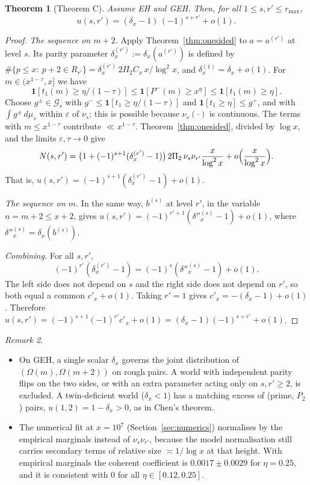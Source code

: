 \documentclass[11pt]{amsart}
\newtheorem{theorem}{Theorem}[section]
\theoremstyle{definition}
\theoremstyle{remark}
\newtheorem{remark}[theorem]{Remark}
\begin{document}
\begin{theorem}[Theorem C]\label{thm:B}
Assume EH and GEH. Then, for all $1\le s,r'\le r_{\max}$,
\[
u(s,r')=(\delta_x-1)\,(-1)^{s+r'}+o(1).
\]
\end{theorem}
\begin{proof}
\emph{The sequence on $m+2$.} Apply Theorem~\ref{thm:onesided} to $a=a^{(r')}$ at level $s$. Its parity parameter $\delta^{(r')}_x:=\delta_x(a^{(r')})$ is defined by $\#\{p\le x:\ p+2\in R_{r'}\}=\delta^{(r')}_x\,2\Pi_2C_x\,x/\log^2x$, and $\delta^{(1)}_x=\delta_x+o(1)$. For $m\in(x^{1-\tau},x]$ we have
\[
\mathbf 1[t_1(m)\ge\eta/(1-\tau)]\le\mathbf 1[P^-(m)\ge x^\eta]\le\mathbf 1[t_1(m)\ge\eta].
\]
Choose $g^\pm\in\mathcal G_s$ with $g^-\le\mathbf 1[t_1\ge\eta/(1-\tau)]$ and $\mathbf 1[t_1\ge\eta]\le g^+$, and with $\int g^\pm\,d\mu_s$ within $\varepsilon$ of $\nu_s$; this is possible because $\nu_s(\cdot)$ is continuous. The terms with $m\le x^{1-\tau}$ contribute $\ll x^{1-\tau}$. Theorem~\ref{thm:onesided}, divided by $\log x$, and the limits $\varepsilon,\tau\to0$ give
\[
N(s,r')=\bigl(1+(-1)^{s+1}(\delta^{(r')}_x-1)\bigr)\,2\Pi_2\,\nu_s\nu_{r'}\frac{x}{\log^2x}+o\Bigl(\frac{x}{\log^2x}\Bigr).
\]
That is, $u(s,r')=(-1)^{s+1}(\delta^{(r')}_x-1)+o(1)$.

\emph{The sequence on $m$.} In the same way, $b^{(s)}$ at level $r'$, in the variable $n=m+2\le x+2$, gives $u(s,r')=(-1)^{r'+1}(\delta''^{(s)}_x-1)+o(1)$, where $\delta''^{(s)}_x=\delta_x(b^{(s)})$.

\emph{Combining.} For all $s,r'$,
\[
(-1)^{r'}(\delta^{(r')}_x-1)=(-1)^{s}(\delta''^{(s)}_x-1)+o(1).
\]
The left side does not depend on $s$ and the right side does not depend on $r'$, so both equal a common $c'_x+o(1)$. Taking $r'=1$ gives $c'_x=-(\delta_x-1)+o(1)$. Therefore $u(s,r')=(-1)^{s+1}(-1)^{r'}c'_x+o(1)=(\delta_x-1)(-1)^{s+r'}+o(1)$.
\end{proof}

\begin{remark}
\leavevmode
\begin{itemize}
\item On GEH, a single scalar $\delta_x$ governs the joint distribution of $(\Omega(m),\Omega(m+2))$ on rough pairs. A world with independent parity flips on the two sides, or with an extra parameter acting only on $s,r'\ge2$, is excluded. A twin-deficient world ($\delta_x<1$) has a matching excess of (prime, $P_2$) pairs, $u(1,2)=1-\delta_x>0$, as in Chen's theorem.
\item The numerical fit at $x=10^7$ (Section~\ref{sec:numerics}) normalises by the empirical marginals instead of $\nu_s\nu_{r'}$, because the model normalisation still carries secondary terms of relative size $\asymp1/\log x$ at that height. With empirical marginals the coherent coefficient is $0.0017\pm0.0029$ for $\eta=0.25$, and it is consistent with $0$ for all $\eta\in[0.12,0.25]$.
\end{itemize}
\end{remark}
\end{document}
